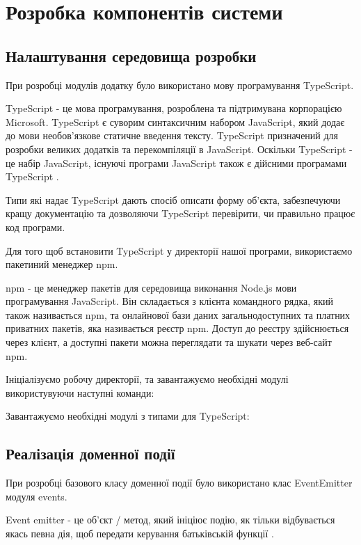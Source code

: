 \section{Розробка компонентів системи}

\subsection{Налаштування середовища розробки}
При розробці модулів додатку було використано мову програмування TypeScript.

TypeScript - це мова програмування, розроблена та підтримувана корпорацією Microsoft.
TypeScript є суворим синтаксичним набором JavaScript, який додає до мови необов'язкове статичне введення тексту.
TypeScript призначений для розробки великих додатків та перекомпіляції в JavaScript.
Оскільки TypeScript - це набір JavaScript, існуючі програми JavaScript також є дійсними програмами TypeScript
\cite{typescript-def}.

Типи які надає TypeScript дають спосіб описати форму об’єкта,
забезпечуючи кращу документацію та дозволяючи TypeScript перевірити, чи правильно працює код програми.

Для того щоб встановити TypeScript у директорії нашої програми, використаємо пакетиний менеджер npm.

npm - це менеджер пакетів для середовища виконання Node.js мови програмування JavaScript.
Він складається з клієнта командного рядка, який також називається npm,
та онлайнової бази даних загальнодоступних та платних приватних пакетів, яка називається реєстр npm.
Доступ до реєстру здійснюється через клієнт, а доступні пакети можна
переглядати та шукати через веб-сайт npm.

Ініціалізуємо робочу директорії, та завантажуємо необхідні модулі використувуючи наступні команди:


Завантажуємо необхідні модулі з типами для TypeScript:



\subsection{Реалізація доменної події}

При розробці базового класу доменної події було використано клас EventEmitter модуля events.

Event emitter - це об'єкт / метод, який ініціює подію, як тільки відбувається якась певна дія,
щоб передати керування батьківській функції \cite{event-emitter-doc}.

